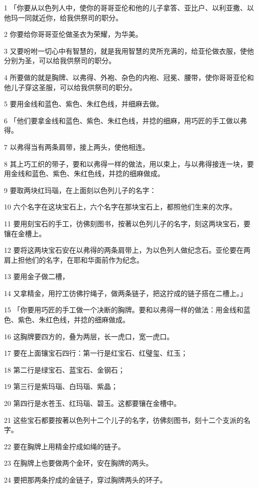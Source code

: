 \par 1 「你要从以色列人中，使你的哥哥亚伦和他的儿子拿答、亚比户、以利亚撒、以他玛一同就近你，给我供祭司的职分。
\par 2 你要给你哥哥亚伦做圣衣为荣耀，为华美。
\par 3 又要吩咐一切心中有智慧的，就是我用智慧的灵所充满的，给亚伦做衣服，使他分别为圣，可以给我供祭司的职分。
\par 4 所要做的就是胸牌、以弗得、外袍、杂色的内袍、冠冕、腰带，使你哥哥亚伦和他儿子穿这圣服，可以给我供祭司的职分。
\par 5 要用金线和蓝色、紫色、朱红色线，并细麻去做。
\par 6 「他们要拿金线和蓝色、紫色、朱红色线，并捻的细麻，用巧匠的手工做以弗得。
\par 7 以弗得当有两条肩带，接上两头，使他相连。
\par 8 其上巧工织的带子，要和以弗得一样的做法，用以束上，与以弗得接连一块，要用金线和蓝色、紫色、朱红色线，并捻的细麻做成。
\par 9 要取两块红玛瑙，在上面刻以色列儿子的名字：
\par 10 六个名字在这块宝石上，六个名字在那块宝石上，都照他们生来的次序。
\par 11 要用刻宝石的手工，彷佛刻图书，按著以色列儿子的名字，刻这两块宝石，要镶在金槽上。
\par 12 要将这两块宝石安在以弗得的两条肩带上，为以色列人做纪念石。亚伦要在两肩上担他们的名字，在耶和华面前作为纪念。
\par 13 要用金子做二槽，
\par 14 又拿精金，用拧工彷佛拧绳子，做两条链子，把这拧成的链子搭在二槽上。」
\par 15 「你要用巧匠的手工做一个决断的胸牌。要和以弗得一样的做法：用金线和蓝色、紫色、朱红色线，并捻的细麻做成。
\par 16 这胸牌要四方的，叠为两层，长一虎口，宽一虎口。
\par 17 要在上面镶宝石四行：第一行是红宝石、红璧玺、红玉；
\par 18 第二行是绿宝石、蓝宝石、金钢石；
\par 19 第三行是紫玛瑙、白玛瑙、紫晶；
\par 20 第四行是水苍玉、红玛瑙、碧玉。这都要镶在金槽中。
\par 21 这些宝石都要按著以色列十二个儿子的名字，彷佛刻图书，刻十二个支派的名字。
\par 22 要在胸牌上用精金拧成如绳的链子。
\par 23 在胸牌上也要做两个金环，安在胸牌的两头。
\par 24 要把那两条拧成的金链子，穿过胸牌两头的环子。
